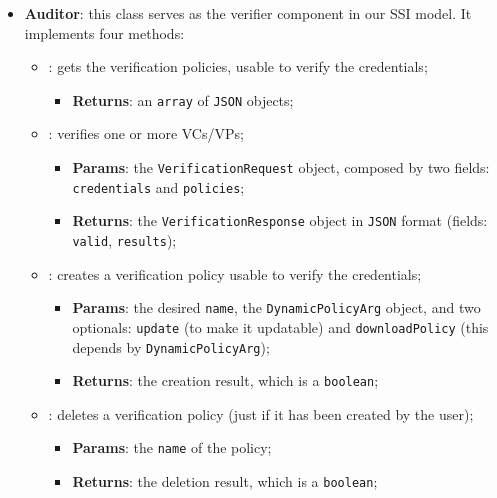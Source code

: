 \begin{itemize}
    \item \textbf{Auditor}: this class serves as the verifier component in our
    SSI model. It implements four methods:
    \begin{itemize}
        \setlength{\itemsep}{0.4cm}
        \item[] : gets the verification policies, usable
        to verify the credentials;
        \begin{itemize}
            \item \textbf{Returns}: an \texttt{array} of \texttt{JSON} objects;
        \end{itemize}
        \item[] : verifies one or more VCs/VPs;
        \begin{itemize}
            \item \textbf{Params}: the \texttt{VerificationRequest} object, composed by two fields:
            \texttt{credentials} and \texttt{policies};
            \item \textbf{Returns}: the \texttt{VerificationResponse}  object 
            in \texttt{JSON} format (fields: \texttt{valid}, \texttt{results});
        \end{itemize}
        \item[] : creates a verification policy
        usable to verify the credentials;
        \begin{itemize}
            \item \textbf{Params}: the desired \texttt{name}, the \texttt{DynamicPolicyArg} object,
            and two optionals: \texttt{update} (to make it updatable) and 
            \texttt{downloadPolicy} (this depends by \texttt{DynamicPolicyArg});
            \item \textbf{Returns}: the creation result, which is a \texttt{boolean};
        \end{itemize}
        \item[] : deletes a verification policy (just
        if it has been created by the user);
        \begin{itemize}
            \item \textbf{Params}: the \texttt{name} of the policy;
            \item \textbf{Returns}: the deletion result, which is a \texttt{boolean};
        \end{itemize}
    \end{itemize}


\end{itemize}
